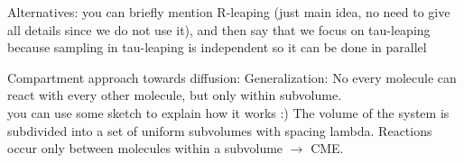 







\ifdebug
Alternatives: you can briefly mention R-leaping (just main idea, no need to give all details since we do not use it), and then say that we focus on tau-leaping because sampling in tau-leaping is independent so it can be done in parallel

Compartment approach towards diffusion: Generalization: No every molecule can react with every other molecule, but only within subvolume. \\ you can use some sketch to explain how it works :) The volume of the system is subdivided into a set of uniform subvolumes with spacing lambda. Reactions occur only between molecules within a subvolume $\rightarrow$ CME.
\fi

